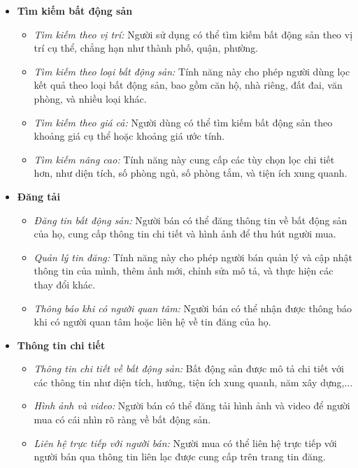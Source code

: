 \begin{itemize}
    \item \textbf{Tìm kiếm bất động sản}
    \begin{itemize}
    \item \textit{Tìm kiếm theo vị trí:} Người sử dụng có thể tìm kiếm bất động sản theo vị trí cụ thể, chẳng hạn như thành phố, quận, phường.
    \item \textit{Tìm kiếm theo loại bất động sản:} Tính năng này cho phép người dùng lọc kết quả theo loại bất động sản, bao gồm căn hộ, nhà riêng, đất đai, văn phòng, và nhiều loại khác.
    \item \textit{Tìm kiếm theo giá cả:} Người dùng có thể tìm kiếm bất động sản theo khoảng giá cụ thể hoặc khoảng giá ước tính.
    \item \textit{Tìm kiếm nâng cao:} Tính năng này cung cấp các tùy chọn lọc chi tiết hơn, như diện tích, số phòng ngủ, số phòng tắm, và tiện ích xung quanh.
    \end{itemize}
    \item \textbf{Đăng tải}
    \begin{itemize}
        \item \textit{Đăng tin bất động sản:} Người bán có thể đăng thông tin về bất động sản của họ, cung cấp thông tin chi tiết và hình ảnh để thu hút người mua.
        \item \textit{Quản lý tin đăng:} Tính năng này cho phép người bán quản lý và cập nhật thông tin của mình, thêm ảnh mới, chỉnh sửa mô tả, và thực hiện các thay đổi khác.
        \item \textit{Thông báo khi có người quan tâm:} Người bán có thể nhận được thông báo khi có người quan tâm hoặc liên hệ về tin đăng của họ.
    \end{itemize}
    \item \textbf{Thông tin chi tiết}
    \begin{itemize}
        \item \textit{Thông tin chi tiết về bất động sản:} Bất động sản được mô tả chi tiết với các thông tin như diện tích, hướng, tiện ích xung quanh, năm xây dựng,...
        \item \textit{Hình ảnh và video:} Người bán có thể đăng tải hình ảnh và video để người mua có cái nhìn rõ ràng về bất động sản.
        \item \textit{Liên hệ trực tiếp với người bán:} Người mua có thể liên hệ trực tiếp với người bán qua thông tin liên lạc được cung cấp trên trang tin đăng.
    \end{itemize}

\end{itemize}
